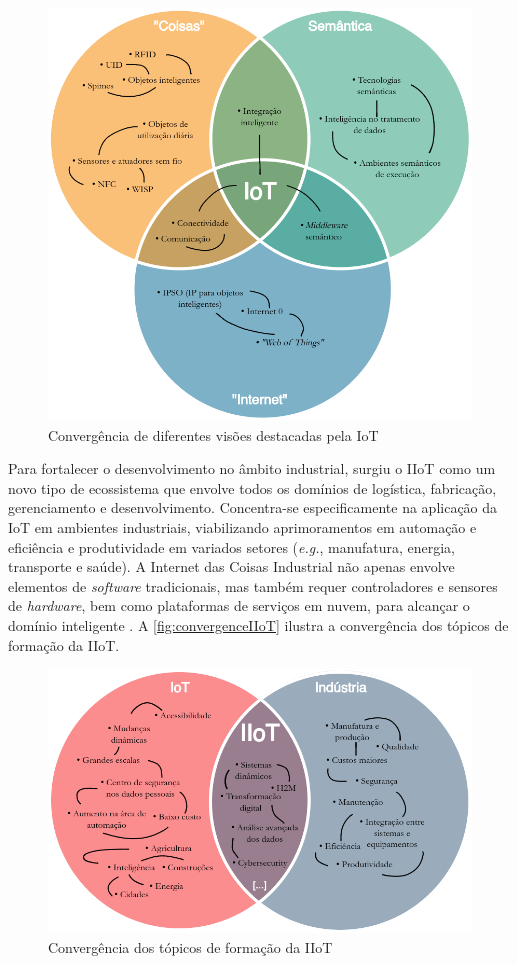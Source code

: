     \begin{figure}[htbp]
        \caption{Convergência de diferentes visões destacadas pela IoT}
        \label{fig:convergenceIoT}
        \begin{center}
            \includegraphics[width=0.7\linewidth]{USPSC-img/convergenceIoT2-low.png}
        \end{center}
    \end{figure}
    
    Para fortalecer o desenvolvimento no âmbito industrial, surgiu o IIoT como um novo tipo de ecossistema que envolve todos os domínios de logística, fabricação, gerenciamento e desenvolvimento. Concentra-se especificamente na aplicação da IoT em ambientes industriais, viabilizando aprimoramentos em automação e eficiência e produtividade em variados setores (\textit{e.g.}, manufatura, energia, transporte e saúde). A Internet das Coisas Industrial não apenas envolve elementos de \textit{software} tradicionais, mas também requer controladores e sensores de \textit{hardware}, bem como plataformas de serviços em nuvem, para alcançar o domínio inteligente \cite{huichao2020}. A \autoref{fig:convergenceIIoT} ilustra a convergência dos tópicos de formação da IIoT.

    \begin{figure}[htbp]
        \caption{Convergência dos tópicos de formação da IIoT}
        \label{fig:convergenceIIoT}
        \begin{center}
            \includegraphics[width=0.7\linewidth]{USPSC-img/convergenceIIoT2-low.png}
        \end{center}
    \end{figure}
    
